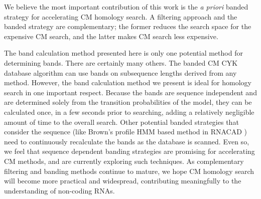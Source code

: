 \documentclass[11pt]{article}
\begin{document}
We believe the most important contribution of this work is the
\emph{a priori} banded strategy for accelerating CM homology
search. A filtering approach and the banded strategy are
complementary; the former reduces the search space for the expensive
CM search, and the latter makes CM search less expensive.

The band calculation method presented here is only one potential
method for determining bands. There are certainly many others. 
The banded CM CYK database algorithm can use bands on subsequence
lengths derived from any method.
However, the band calculation method we present is ideal for homology search in
one important respect. Because the bands are sequence independent and are
determined solely from the transition probabilities of the model, they
can be calculated once, in a few seconds prior to searching, 
adding a relatively negligible amount of time to the overall search.
Other potential banded strategies that consider the sequence (like
Brown's profile HMM based method in \textsc{RNACAD} \cite{Brown00})
need to continuously recalculate the bands as the database is
scanned. Even so, we feel that sequence dependent banding strategies
are promising for accelerating CM methods, and are currently exploring
such techniques.
As complementary filtering and banding methods continue to mature, we
hope CM homology search will become more practical and widespread,
contributing meaningfully to the understanding of non-coding RNAs.
\end{document}
